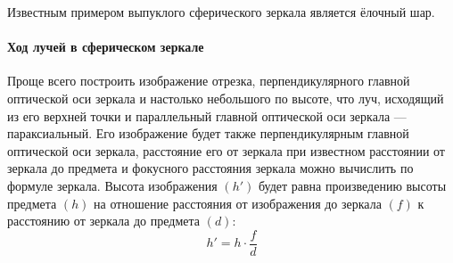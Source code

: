 \documentclass[11pt]{article}
\begin{document}
\begin{enumerate}
			Известным примером выпуклого сферического зеркала является ёлочный шар.
			\paragraph{Ход лучей в сферическом зеркале}
			Проще всего построить изображение отрезка, перпендикулярного главной оптической оси зеркала и настолько небольшого по высоте, что луч, исходящий из его верхней точки и параллельный главной оптической оси зеркала — параксиальный. Его изображение будет также перпендикулярным главной оптической оси зеркала, расстояние его от зеркала при известном расстоянии от зеркала до предмета и фокусного расстояния зеркала можно вычислить по формуле зеркала. Высота изображения $(h')$ будет равна произведению высоты предмета $(h)$ на отношение расстояния от изображения до зеркала $(f)$ к расстоянию от зеркала до предмета $(d)$:
			$$
				h' = h\cdot\frac{f}{d}
			$$

\end{enumerate}
\end{document}
